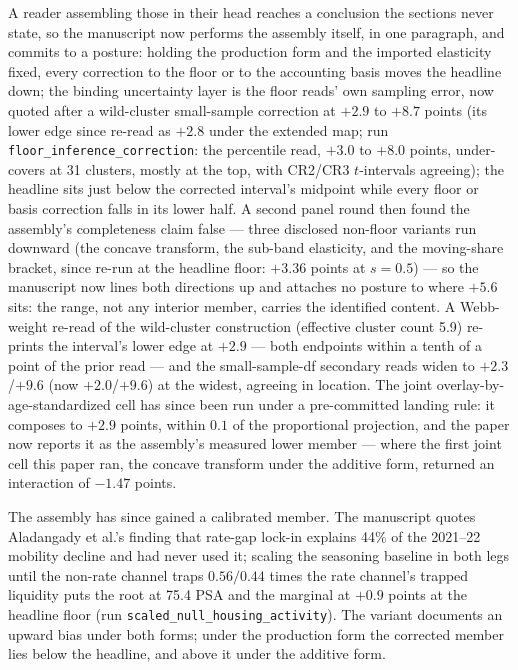 \documentclass[11pt]{article}
\begin{document}
A reader assembling those in their head reaches a conclusion the sections never state,
so the manuscript now performs the assembly itself, in one paragraph, and commits to a
posture: holding the production form and the imported elasticity fixed, every
correction to the floor or to the accounting basis moves the headline down; the
binding uncertainty layer is the floor reads' own sampling error, now quoted after a
wild-cluster small-sample correction at $+2.9$ to $+8.7$ points (its lower edge since re-read as $+2.8$ under the extended map; run
\texttt{floor\_inference\_correction}: the percentile read, $+3.0$ to $+8.0$ points,
under-covers at 31 clusters, mostly at the top, with CR2/CR3 $t$-intervals agreeing);
the headline sits just below the corrected interval's midpoint while every floor or
basis correction falls in its lower half. A second panel round then found the
assembly's completeness claim false --- three disclosed non-floor variants run
downward (the concave transform, the sub-band elasticity, and the moving-share
bracket, since re-run at the headline floor: $+3.36$ points at $s=0.5$) --- so the
manuscript now lines both directions up and attaches no posture to where $+5.6$
sits: the range, not any interior member, carries the identified content. A Webb-weight re-read of the wild-cluster construction (effective cluster count 5.9) re-prints the interval's lower edge at $+2.9$ --- both endpoints within a tenth of a point of the prior read --- and the small-sample-df secondary reads widen to $+2.3$/$+9.6$ (now $+2.0$/$+9.6$) at the widest, agreeing in location. The joint overlay-by-age-standardized
cell has since been run under a pre-committed landing rule: it composes to $+2.9$
points, within $0.1$ of the proportional projection, and the paper now reports it
as the assembly's measured lower member --- where the first joint cell this paper
ran, the concave transform under the additive form, returned an interaction of
$-1.47$ points.

The assembly has since gained a calibrated member. The manuscript quotes Aladangady
et al.'s finding that rate-gap lock-in explains 44\% of the 2021--22 mobility decline
and had never used it; scaling the seasoning baseline in both legs until the non-rate
channel traps $0.56/0.44$ times the rate channel's trapped liquidity puts the root at
75.4 PSA and the marginal at $+0.9$ points at the headline floor (run
\texttt{scaled\_null\_housing\_activity}). The variant documents an upward bias under both forms; under the
production form the corrected member lies below the headline, and above it
under the additive form.
\end{document}
